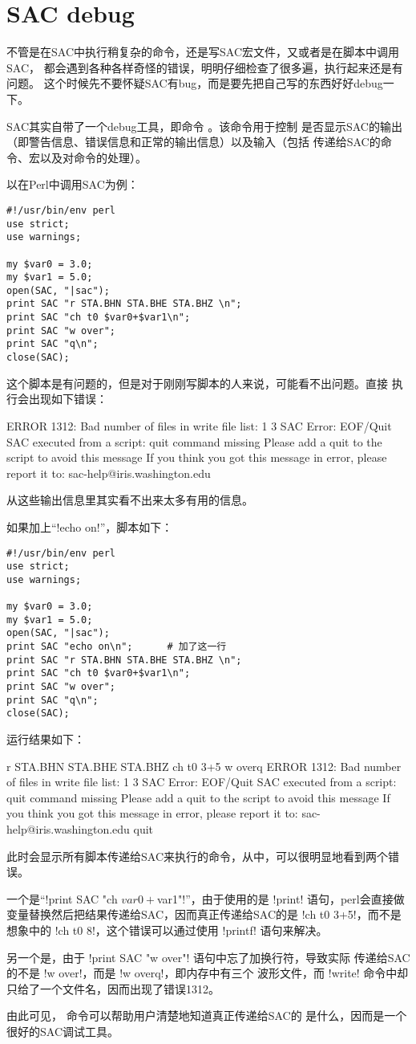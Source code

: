 \section{SAC debug}
不管是在SAC中执行稍复杂的命令，还是写SAC宏文件，又或者是在脚本中调用SAC，
都会遇到各种各样奇怪的错误，明明仔细检查了很多遍，执行起来还是有问题。
这个时候先不要怀疑SAC有bug，而是要先把自己写的东西好好debug一下。

SAC其实自带了一个debug工具，即命令 。该命令用于控制
是否显示SAC的输出（即警告信息、错误信息和正常的输出信息）以及输入（包括
传递给SAC的命令、宏以及对命令的处理）。

以在Perl中调用SAC为例：
\begin{verbatim}
#!/usr/bin/env perl
use strict;
use warnings;

my $var0 = 3.0;
my $var1 = 5.0;
open(SAC, "|sac");
print SAC "r STA.BHN STA.BHE STA.BHZ \n";
print SAC "ch t0 $var0+$var1\n";
print SAC "w over";
print SAC "q\n";
close(SAC);
\end{verbatim}

这个脚本是有问题的，但是对于刚刚写脚本的人来说，可能看不出问题。直接
执行会出现如下错误：
\begin{SACCode}
 ERROR 1312: Bad number of files in write file list: 1 3
SAC Error: EOF/Quit
     SAC executed from a script: quit command missing
     Please add a quit to the script to avoid this message
     If you think you got this message in error,
     please report it to: sac-help@iris.washington.edu
\end{SACCode}
从这些输出信息里其实看不出来太多有用的信息。

如果加上``!echo on!''，脚本如下：
\begin{verbatim}
#!/usr/bin/env perl
use strict;
use warnings;

my $var0 = 3.0;
my $var1 = 5.0;
open(SAC, "|sac");
print SAC "echo on\n";      # 加了这一行
print SAC "r STA.BHN STA.BHE STA.BHZ \n";
print SAC "ch t0 $var0+$var1\n";
print SAC "w over";
print SAC "q\n";
close(SAC);
\end{verbatim}

运行结果如下：
\begin{SACCode}
 r STA.BHN STA.BHE STA.BHZ
 ch t0 3+5
 w overq
 ERROR 1312: Bad number of files in write file list: 1 3
SAC Error: EOF/Quit
     SAC executed from a script: quit command missing
     Please add a quit to the script to avoid this message
     If you think you got this message in error,
     please report it to: sac-help@iris.washington.edu
 quit
\end{SACCode}
此时会显示所有脚本传递给SAC来执行的命令，从中，可以很明显地看到两个错误。

一个是``!print SAC "ch $var0+$var1\n"!''，由于使用的是 !print!
语句，perl会直接做变量替换然后把结果传递给SAC，因而真正传递给SAC的是
!ch t0 3+5!，而不是想象中的 !ch t0 8!，这个错误可以通过使用
!printf! 语句来解决。

另一个是，由于 !print SAC "w over"! 语句中忘了加换行符，导致实际
传递给SAC的不是 !w over!，而是 !w overq!，即内存中有三个
波形文件，而 !write! 命令中却只给了一个文件名，因而出现了错误1312。

由此可见， 命令可以帮助用户清楚地知道真正传递给SAC的
是什么，因而是一个很好的SAC调试工具。
